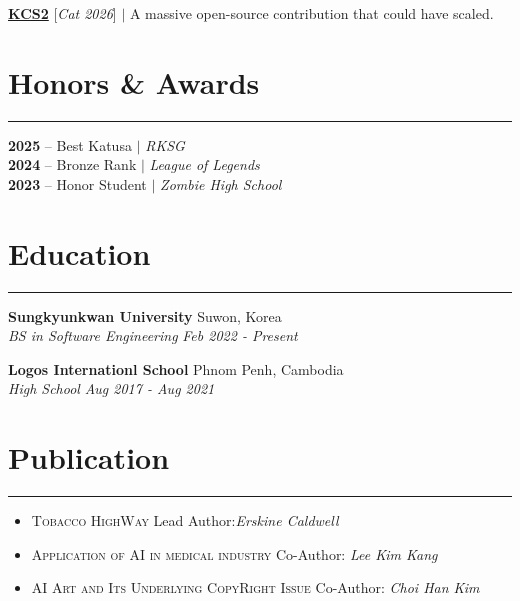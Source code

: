 \documentclass[letterpaper, 10pt]{article}
\begin{document}
\smallskip
\noindent
\href{https://m.media-amazon.com/images/I/712tQUrusKL._AC_UF894,1000_QL80_.jpg}{\textbf{KCS2}} [{\textit{Cat 2026}}] $|$ A massive open-source contribution that could have scaled.


\vspace{4pt}
\section*{Honors \& Awards}
\hrule
\vspace{4pt}

\textbf{2025} -- Best Katusa $|$ \textit{RKSG} \\
\textbf{2024} -- Bronze Rank $|$ \textit{League of Legends} \\
\textbf{2023} -- Honor Student $|$ \textit{Zombie High School}

\section*{Education}
\hrule
\vspace{4pt}

\textbf{Sungkyunkwan University} \hfill Suwon, Korea \\
\textit{\fontsize{10}{10}\selectfont BS in Software Engineering}
\hfill \textit{Feb 2022 - Present}

\smallskip
\noindent
\textbf{Logos Internationl School} \hfill Phnom Penh, Cambodia \\
\textit{\fontsize{10}{10}\selectfont High School}
\hfill \textit{Aug 2017 - Aug 2021}

\section*{Publication}
\hrule \vspace{4pt}

\begin{itemize}
    \item \textsc{Tobacco HighWay} 
    \hfill Lead Author:\textit{Erskine Caldwell}
    \item \textsc{Application of AI in medical industry}
    \hfill Co-Author: \textit{Lee Kim Kang}
    \item \textsc{AI Art and Its Underlying CopyRight Issue}
    \hfill Co-Author: \textit{Choi Han Kim}
\end{itemize}
\end{document}
